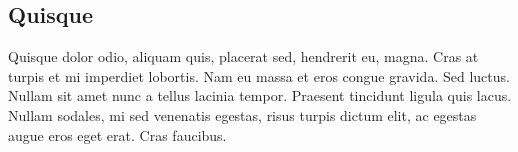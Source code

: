 \documentclass[a4paper,twocolumn,10pt]{article}
\begin{document}
\subsection*{Quisque}

Quisque dolor odio, aliquam quis, placerat sed, hendrerit eu, magna. Cras at
turpis et mi imperdiet lobortis. Nam eu massa et eros congue gravida. Sed
luctus. Nullam sit amet nunc a tellus lacinia tempor. Praesent tincidunt ligula
quis lacus. Nullam sodales, mi sed venenatis egestas, risus turpis dictum elit,
ac egestas augue eros eget erat. Cras faucibus.



\end{document}
